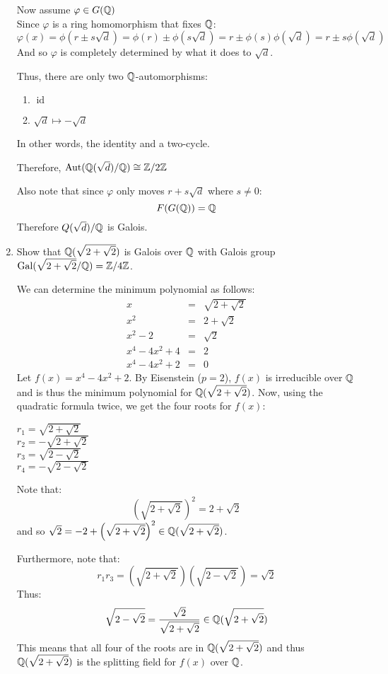 \documentclass[letterpaper,12pt,fleqn]{article}
\DeclareMathOperator{\Aut}{Aut}
\newcommand{\vp}{\varphi}
\DeclareMathOperator{\Gal}{Gal}
\DeclareMathOperator{\id}{id}
\begin{document}
\begin{enumerate}
  Now assume $\vp\in G(\Q)$ \\
  Since $\vp$ is a ring homomorphism that fixes $\mathbb{Q}$:
  \[\vp(x)=\phi(r\pm s\sqrt{d})=\phi(r)\pm\phi(s\sqrt{d})=r\pm\phi(s)\phi(\sqrt{d})=
  r\pm s\phi(\sqrt{d})\]
  And so $\vp$ is completely determined by what it does to $\sqrt{d}$.
  
  Thus, there are only two $\mathbb{Q}$-automorphisms:
  \begin{enumerate}
  \item $\id$
  \item $\sqrt{d}\mapsto -\sqrt{d}$
  \end{enumerate}
  In other words, the identity and a two-cycle.

  Therefore, $\Aut(\Q(\sqrt{d})/\Q)\cong \Z/2\Z$

  Also note that since $\vp$ only moves $r+s\sqrt{d}$ where $s\ne 0$:
  \[F(G(\mathbb{Q}))=\mathbb{Q}\]
  Therefore $Q(\sqrt{d})/\mathbb{Q}$ is Galois.

  \newcommand{\sstwo}{\sqrt{2+\sqrt{2}}}
  \newcommand{\ssmtwo}{\sqrt{2-\sqrt{2}}}

\item Show that $\Q(\sstwo)$ is Galois over $\mathbb{Q}$ with Galois group
  $\Gal(\sstwo/\Q)=\Z/4\Z$.

  We can determine the minimum polynomial as follows:
  \begin{eqnarray*}
    x &=& \sstwo \\
    x^2 &=& 2+\sqrt{2} \\
    x^2-2 &=& \sqrt{2} \\
    x^4-4x^2+4 &=& 2 \\
    x^4-4x^2+2 &=& 0
  \end{eqnarray*}
  Let $f(x)=x^4-4x^2+2$. By Eisenstein ($p=2$), $f(x)$ is irreducible over $\mathbb{Q}$ and is
  thus the minimum polynomial for $\Q(\sstwo)$. Now, using the quadratic formula twice,
  we get the four roots for $f(x)$:

  $r_1=\sstwo$ \\
  $r_2=-\sstwo$ \\
  $r_3=\ssmtwo$ \\
  $r_4=-\ssmtwo$

  Note that:
  \[\left(\sstwo\right)^2=2+\sqrt{2}\]
  and so $\sqrt{2}=-2+\left(\sstwo\right)^2\in\Q(\sstwo)$.
  
  Furthermore, note that:
  \[r_1r_3=\left(\sstwo\right)\left(\ssmtwo\right)=\sqrt{2}\]
  Thus:
  \[\ssmtwo=\frac{\sqrt{2}}{\sstwo}\in\Q(\sstwo)\]
  This means that all four of the roots are in $\Q(\sstwo)$ and thus $\Q(\sstwo)$ is the
  splitting field for $f(x)$ over $\mathbb{Q}$.


\end{enumerate}
\end{document}
